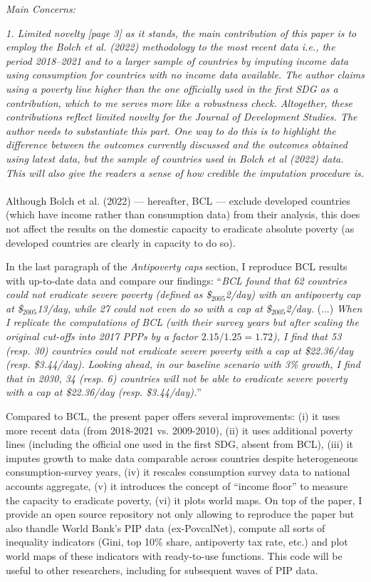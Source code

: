 \documentclass[12pt,english]{article}
\begin{document}
\textit{Main Concerns:}

\textit{1.	Limited novelty}
\textit{[page 3] as it stands, the main contribution of this paper is to employ the Bolch et al. (2022) methodology to the most recent data i.e., the period 2018–2021 and to a larger sample of countries by imputing income data using consumption for countries with no income data available. The author claims using a poverty line higher than the one officially used in the first SDG as a contribution, which to me serves more like a robustness check. Altogether, these contributions reflect limited novelty for the Journal of Development Studies. The author needs to substantiate this part. One way to do this is to highlight the difference between the outcomes currently discussed and the outcomes obtained using latest data, but the sample of countries used in Bolch et al (2022) data. This will also give the readers a sense of how credible the imputation procedure is.    }~\\

Although Bolch et al. (2022) --- hereafter, BCL --- exclude developed countries (which have income rather than consumption data) from their analysis, this does not affect the results on the domestic capacity to eradicate absolute poverty (as developed countries are clearly in capacity to do so). 

In the last paragraph of the \textit{Antipoverty caps} section, I reproduce BCL results with up-to-date data and compare our findings: ``\textit{BCL found that 62 countries could not eradicate severe poverty (defined as \$$_\text{2005}$2/day) with an antipoverty cap at \$$_\text{2005}$13/day, while 27 could not even do so with a cap at \$$_\text{2005}$2/day.} (...) \textit{When I replicate the computations of BCL (with their survey years but after scaling the original cut-offs into 2017 PPPs by a factor $2.15/1.25 = 1.72$), I find that 53 (resp. 30) 
countries could not eradicate severe poverty with a cap at \$22.36/day (resp. \$3.44/day). Looking ahead, in our baseline scenario with 3\% growth, I find that in 2030, 34 (resp. 6) 
countries will not be able to eradicate severe poverty with a cap at \$22.36/day (resp. \$3.44/day).}''

Compared to BCL, the present paper offers several improvements: (i) it uses more recent data (from 2018-2021 vs. 2009-2010), (ii) it uses additional poverty lines (including the official one used in the first SDG, absent from BCL), (iii) it imputes growth to make data comparable across countries despite heterogeneous consumption-survey years, (iv) it rescales consumption survey data to national accounts aggregate, (v) it introduces the concept of ``income floor'' to measure the capacity to eradicate poverty, (vi) it plots world maps. On top of the paper, I provide an open source repository not only allowing to reproduce the paper but also thandle World Bank's PIP data (ex-PovcalNet), compute all sorts of inequality indicators (Gini, top 10\% share, antipoverty tax rate, etc.) and plot world maps of these indicators with ready-to-use functions. This code will be useful to other researchers, including for subsequent waves of PIP data. 
\end{document}
